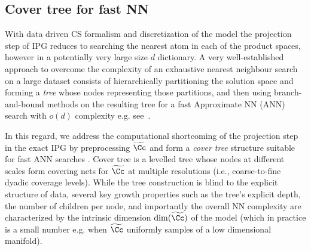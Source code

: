 \subsection{Cover tree for fast NN}
With data driven CS formalism and discretization of the model  %
the projection step of IPG reduces to searching the nearest atom in each of the product spaces, however in a potentially very large size $d$ dictionary. 
A very well-established approach to overcome the complexity of an exhaustive nearest neighbour search on a large dataset consists of hierarchically partitioning the solution space and forming a \emph{tree} whose nodes representing those partitions, and then using branch-and-bound methods on the resulting tree for a fast Approximate NN (ANN) search with $o(d)$ complexity e.g. see~\cite{Navigating,beygelzimer2006cover}.

In this regard, we address the computational shortcoming of the projection step in the exact IPG by preprocessing $\widetilde \Cc$ and form a \emph{cover tree} structure suitable for fast ANN searches \cite{beygelzimer2006cover}. Cover tree is a levelled tree whose nodes at different scales form  covering nets for $\widetilde \Cc$ at multiple resolutions (i.e., coarse-to-fine dyadic coverage levels). %
While the tree construction is blind to the explicit structure of data, several key growth properties such as the tree's explicit depth, the number of children per node, and importantly the overall NN complexity are characterized by the intrinsic dimension $\dim(\widetilde \Cc)$ of the model (which in practice  is a small number e.g. when $\widetilde \Cc$ uniformly samples of a low dimensional manifold).





